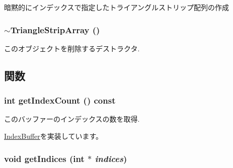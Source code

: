 暗黙的にインデックスで指定したトライアングルストリップ配列の作成 \hypertarget{classm3g_1_1TriangleStripArray_1cb3853bf79b7710d57044da818d2cde}{
\subsubsection[{$\sim$TriangleStripArray}]{\setlength{\rightskip}{0pt plus 5cm}$\sim${\bf TriangleStripArray} ()}}
\label{classm3g_1_1TriangleStripArray_1cb3853bf79b7710d57044da818d2cde}


このオブジェクトを削除するデストラクタ. 

\subsection{関数}
\hypertarget{classm3g_1_1TriangleStripArray_fe9ae2993ebcdb93d5ff26d57c81b73e}{
\subsubsection[{getIndexCount}]{\setlength{\rightskip}{0pt plus 5cm}int getIndexCount () const}}
\label{classm3g_1_1TriangleStripArray_fe9ae2993ebcdb93d5ff26d57c81b73e}


このバッファーのインデックスの数を取得. 

\hyperlink{classm3g_1_1IndexBuffer_ac7d2c37f177b21195a81f00061ef94e}{IndexBuffer}を実装しています。\hypertarget{classm3g_1_1TriangleStripArray_650953afac45099025a524ab160b911f}{
\subsubsection[{getIndices}]{\setlength{\rightskip}{0pt plus 5cm}void getIndices (int $\ast$ {\em indices})}}
\label{classm3g_1_1TriangleStripArray_650953afac45099025a524ab160b911f}


